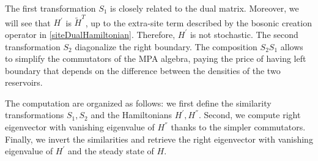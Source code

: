 \documentclass[10pt]{article}
\numberwithin{equation}{section}
\numberwithin{equation}{subsection}
\newcommand{\com}[1]{{ (* {\color{red}\small #1}*)}}
\begin{document}
The first transformation $S_{1}$ is closely related to the dual matrix. Moreover, we will see that $H^{'}$ is $\widetilde{H}^{T}$, up to the extra-site term described by the bosonic creation operator in \eqref{siteDualHamiltonian}. Therefore, $H^{'}$ is not stochastic. The second transformation $S_{2}$ diagonalize the right boundary. The composition  $S_{2} S_{1}$ allows to simplify the commutators of the MPA algebra, paying the price of having left boundary that depends on the difference between the densities of the two reservoirs. 

The computation are organized as follows: we first define the similarity transformations $S_{1},S_{2}$ and the Hamiltonians $H^{'},H^{''}$. Second, we compute right eigenvector with vanishing eigenvalue of $H^{''}$ thanks to the simpler commutators. Finally, we invert the similarities and retrieve the right eigenvector with vanishing eigenvalue of $H^{'}$ and the steady state of $H$.  

\end{document}
